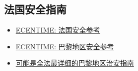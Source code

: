 \subsection{法国安全指南}
\begin{itemize}
    \item \href{https://www.ecentime.com/article/security-guide-in-france}{ECENTIME: 法国安全参考}
    \item \href{https://www.ecentime.com/article/securite-arrondissement}{ECENTIME: 巴黎地区安全参考}
    \item \href{https://mp.weixin.qq.com/s/EOGbefPAPmCXaiPJtq32Gw}{可能是全法最详细的巴黎地区治安指南}
\end{itemize}
